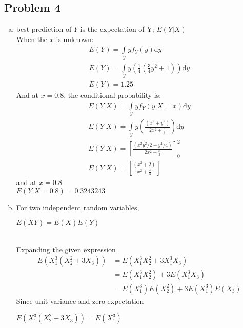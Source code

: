 \documentclass{article}
\begin{document}
\begin{enumerate}[(i)]
\begin{enumerate}[(a)]
        \subsection{Problem 4} %
        \label{sub:problem_4}
        \begin{enumerate}[(a)]
            \item best prediction of $Y$ is the expectation of Y; $E(Y|X)$\\
            When the $x$ is unknown:\\
            \begin{align}
               E(Y) = \int \limits_y yf_{Y}(y) \mathrm{d} y  \nonumber \\
               E(Y) =  \int \limits_y y(\frac{1}{4}(\frac{3}{4}y^2 + 1)) \mathrm{d} y  \nonumber \\
               E(Y) = 1.25
            \end{align}
            And at $x=0.8$, the conditional probability is:\\
            \begin{align}
                E(Y|X) = \int \limits_y yf_{Y}(y|X=x) \mathrm{d} y \nonumber\\
                E(Y|X) = \int \limits_y y(\frac{(x^2 + y^2)}{2x^2 + \frac{8}{3}}) \mathrm{d} y \nonumber \\
                E(Y|X) = \left[ \frac{(x^2y^2/2 + y^4/4)}{2x^2 + \frac{8}{3}}\right]_0^2 \nonumber \\
                E(Y|X) =  \left[ \frac{(x^2 + 2)}{x^2 + \frac{4}{3}}\right]\nonumber
            \end{align}
            and at $x= 0.8$\\
            $E(Y|X = 0.8) = 0.3243243$
            
            \item For two independent random variables,\\
            \centerline{$E(XY) = E(X)E(Y)$}\\
            Expanding the given expression\\
            \begin{align}
                E(X_1^3(X_2^2 + 3X_3)) &= E(X_1^3X_2^2 + 3X_1^3X_3) \nonumber\\
                &= E(X_1^3X_2^2) + 3E(X_1^3X_3) \nonumber \\
                &= E(X_1^3)E(X_2^2) + 3E(X_1^3)E(X_3) \nonumber
            \end{align}
            Since unit variance and zero expectation\\
            \centerline{$E(X_1^3(X_2^2 + 3X_3)) = E(X_1^3)$}\\
        \end{enumerate}
        \newpage

\end{enumerate}
\end{enumerate}
\end{document}
